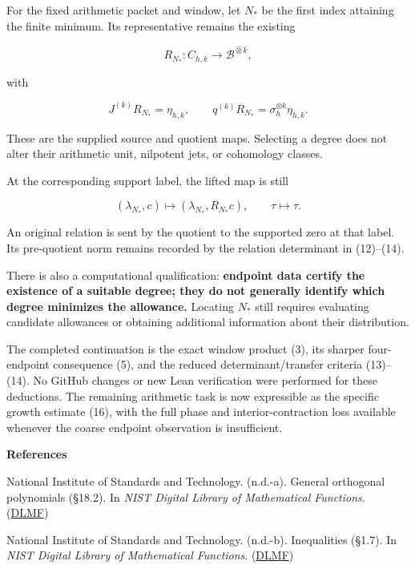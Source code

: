 For the fixed arithmetic packet and window, let \(N_*\) be the first index attaining the finite minimum. Its representative remains the existing

\[
R_{N_*}:C_{h,k}\longrightarrow
\mathscr B^{\widehat\otimes k},
\]

with

\[
J^{(k)}R_{N_*}=\eta_{h,k},
\qquad
q^{(k)}R_{N_*}
=\sigma_h^{\otimes k}\eta_{h,k}.
\]

These are the supplied source and quotient maps. Selecting a degree does not alter their arithmetic unit, nilpotent jets, or cohomology classes.

At the corresponding support label, the lifted map is still

\[
(\lambda_{N_*},c)
\longmapsto
(\lambda_{N_*},R_{N_*}c),
\qquad \tau\longmapsto\tau.
\]

An original relation is sent by the quotient to the supported zero at that label. Its pre-quotient norm remains recorded by the relation determinant in (12)--(14).

There is also a computational qualification: \textbf{endpoint data certify the existence of a suitable degree; they do not generally identify which degree minimizes the allowance.} Locating \(N_*\) still requires evaluating candidate allowances or obtaining additional information about their distribution.

The completed continuation is the exact window product (3), its sharper four-endpoint consequence (5), and the reduced determinant/transfer criteria (13)--(14). No GitHub changes or new Lean verification were performed for these deductions. The remaining arithmetic task is now expressible as the specific growth estimate (16), with the full phase and interior-contraction loss available whenever the coarse endpoint observation is insufficient.

\textbf{References}

National Institute of Standards and Technology. (n.d.-a). General orthogonal polynomials (§18.2). In \emph{NIST Digital Library of Mathematical Functions}. (\href{https://dlmf.nist.gov/18.2?utm_source=chatgpt.com}{DLMF})

National Institute of Standards and Technology. (n.d.-b). Inequalities (§1.7). In \emph{NIST Digital Library of Mathematical Functions}. (\href{https://dlmf.nist.gov/1.7?utm_source=chatgpt.com}{DLMF})
